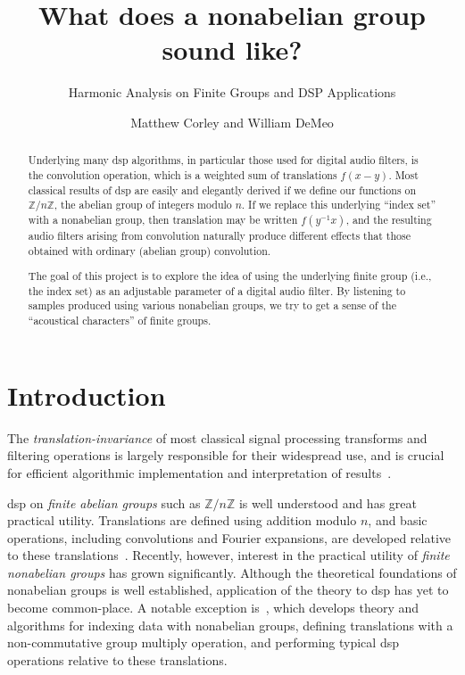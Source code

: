 \documentclass[reqno,onecolumn,oneside]{paper}
\title{What does a nonabelian group sound like?}
\subtitle{Harmonic Analysis on Finite Groups and DSP Applications}
\author{Matthew Corley and William DeMeo}
\theoremstyle{plain}
\theoremstyle{definition}
\theoremstyle{remark}
\numberwithin{theorem}{section}
\numberwithin{claim}{section}
\numberwithin{equation}{section}
\numberwithin{conjecture}{section}
\newcommand{\<}{\ensuremath{\langle}}
\renewcommand{\>}{\ensuremath{\rangle}}
\newcommand{\Z}{\ensuremath{\mathbb{Z}}}
\begin{document}
\maketitle

\begin{abstract}
Underlying many \ac{dsp} algorithms, in particular those used for digital audio
filters, is the convolution operation, which is a weighted sum of translations
$f(x-y)$. Most classical results of \ac{dsp} are easily and elegantly derived if
we define our functions on $\Z/n\Z$, the abelian group of integers modulo $n$. 
If we replace this underlying ``index set'' with a nonabelian group, then
translation may be written $f(y^{-1}x)$, and the resulting audio filters arising
from convolution naturally produce different effects that those obtained with
ordinary (abelian group) convolution. 

The goal of this project is to explore the idea of using the underlying finite
group (i.e., the index set) as an adjustable parameter of a digital audio
filter. By listening to samples produced using various nonabelian groups, we try
to get a sense of the ``acoustical characters'' of finite groups.
\end{abstract}

\section{Introduction}
The \emph{translation-invariance} of most classical signal
processing transforms and filtering operations is largely
responsible for their widespread use, and is crucial for
efficient algorithmic implementation and interpretation 
of results~\cite{An:2003}. 

\ac{dsp} on \emph{finite abelian groups} such as $\Z/n\Z$ is
well understood and has great practical utility.  
Translations are defined using addition modulo $n$, and 
basic operations, including convolutions and Fourier 
expansions, are developed relative to these translations~\cite{Tolimieri:1998}. 
Recently, however, interest in the practical utility of
\emph{finite nonabelian groups} has grown
significantly. Although the theoretical foundations of
nonabelian groups is well established, application of the
theory to \ac{dsp} has yet to  become common-place.
A notable exception is~\cite{An:2003},
which develops theory and algorithms for
indexing data with nonabelian groups, defining translations
with a non-commutative group multiply operation, and
performing typical \ac{dsp} operations relative to these
translations. 
\end{document}
